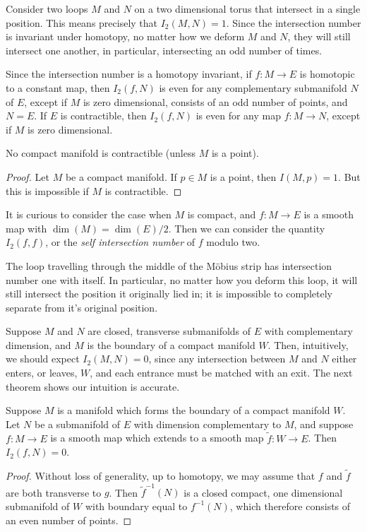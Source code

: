 \begin{example}
    Consider two loops $M$ and $N$ on a two dimensional torus that intersect in a single position. This means precisely that $I_2(M,N) = 1$. Since the intersection number is invariant under homotopy, no matter how we deform $M$ and $N$, they will still intersect one another, in particular, intersecting an odd number of times.
\end{example}

Since the intersection number is a homotopy invariant, if $f: M \to E$ is homotopic to a constant map, then $I_2(f,N)$ is even for any complementary submanifold $N$ of $E$, except if $M$ is zero dimensional, consists of an odd number of points, and $N = E$. If $E$ is contractible, then $I_2(f,N)$ is even for any map $f: M \to N$, except if $M$ is zero dimensional.

\begin{theorem}
    No compact manifold is contractible (unless $M$ is a point).
\end{theorem}
\begin{proof}
    Let $M$ be a compact manifold. If $p \in M$ is a point, then $I(M,p) = 1$. But this is impossible if $M$ is contractible.
\end{proof}

It is curious to consider the case when $M$ is compact, and $f: M \to E$ is a smooth map with $\dim(M) = \dim(E)/2$. Then we can consider the quantity $I_2(f,f)$, or the \emph{self intersection number} of $f$ modulo two.

\begin{example}
    The loop travelling through the middle of the M\"{o}bius strip has intersection number one with itself. In particular, no matter how you deform this loop, it will still intersect the position it originally lied in; it is impossible to completely separate from it's original position.
\end{example}

Suppose $M$ and $N$ are closed, transverse submanifolds of $E$ with complementary dimension, and $M$ is the boundary of a compact manifold $W$. Then, intuitively, we should expect $I_2(M,N) = 0$, since any intersection between $M$ and $N$ either enters, or leaves, $W$, and each entrance must be matched with an exit. The next theorem shows our intuition is accurate.

\begin{theorem}
    Suppose $M$ is a manifold which forms the boundary of a compact manifold $W$. Let $N$ be a submanifold of $E$ with dimension complementary to $M$, and suppose $f: M \to E$ is a smooth map which extends to a smooth map $\tilde{f}: W \to E$. Then $I_2(f,N) = 0$.
\end{theorem}
\begin{proof}
    Without loss of generality, up to homotopy, we may assume that $f$ and $\tilde{f}$ are both transverse to $g$. Then $\tilde{f}^{-1}(N)$ is a closed compact, one dimensional submanifold of $W$ with boundary equal to $f^{-1}(N)$, which therefore consists of an even number of points.
\end{proof}

